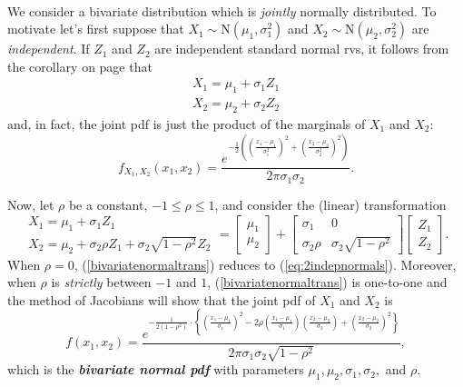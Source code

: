 \documentclass[12pt]{article}
\begin{document}
\label{bivariatenormaldist}\\
\noindent We consider a bivariate distribution which is {\em jointly} normally distributed. To motivate let's first suppose that
$X_1\sim \mbox{N}(\mu_1,\sigma_1^2)$ and $X_2\sim \mbox{N}(\mu_2,\sigma_2^2)$ are {\em independent}.  If $Z_1$ and $Z_2$ are independent
standard normal rvs, it follows from the corollary on page \pageref{normalcor} that
\begin{equation}\begin{array}{l}
X_1=\mu_1 + \sigma_1Z_1\\\label{eq:2indepnormals}
X_2=\mu_2+\sigma_2Z_2 \end{array}
\end{equation}
and, in fact, the joint pdf is just the product of the marginals of $X_1$ and $X_2$:
$$f_{X_1,X_2}(x_1,x_2) = \frac {e^{-\frac 12\left( \left(\frac{x_1-\mu_1}{\sigma_1^2}\right)^2 + \left(\frac{x_2-\mu_2}{\sigma_2^2}\right)^2 \right)}}{2\pi\sigma_1\sigma_2}.$$

\noindent Now, let $\rho$ be a constant, $-1\le \rho \le 1$, and consider the (linear) transformation
\begin{equation}\begin{array}{l}
X_1  =  \mu_1 + \sigma_1Z_1\\\label{bivariatenormaltrans}
X_2  =  \mu_2 + \sigma_2\rho Z_1 + \sigma_2\sqrt{1-\rho^2}Z_2\end{array}
= \left[ \begin{array}{c} \mu_1\\\mu_2 \end{array}\right] + \left[ \begin{array}{cc} \sigma_1 & 0 \\ \sigma_2\rho & \sigma_2\sqrt{1-\rho^2}\end{array}\right]\left[ \begin{array}{c} Z_1\\Z_2 \end{array} \right].
\end{equation}
When $\rho=0$, (\ref{bivariatenormaltrans}) reduces to (\ref{eq:2indepnormals}). Moreover, when $\rho$ is {\em strictly} between $-1$ and $1$,
(\ref{bivariatenormaltrans}) is one-to-one and the method of Jacobians will show that the joint pdf of $X_1$ and $X_2$ is
\begin{equation*}\label{bivariatenormalpdf}
    f(x_1, x_2) = \frac{e^{-\frac{1}{2(1-\rho^2)} \cdot \left\{\left(\frac{x_1 - \mu_1}{\sigma_1}\right)^2 - 2 \rho \left(\frac{x_1 - \mu_1}{\sigma_1}\right) \! \left(\frac{x_2 - \mu_2}{\sigma_2}\right) + \left(\frac{x_2 - \mu_2}{\sigma_2}\right)^2\right\}}}{2\pi \sigma_1 \sigma_2 \sqrt{1 - \rho^2}},
\end{equation*}
\noindent which is the {\bf\em bivariate normal pdf} with parameters $\mu_1, \mu_2, \sigma_1, \sigma_2,$ and $\rho$.\\
\end{document}
